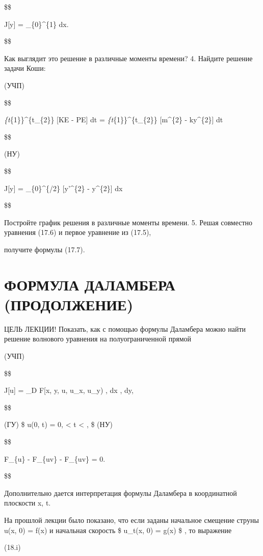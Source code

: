 \documentclass[
  ukrainian,
]{article}
\begin{document}
\$\$

J{[}y{]} = \int\_\{0\}\^{}\{1\}  dx.

\$\$

Как выглядит это решение в различные моменты времени? 4. Найдите решение
задачи Коши:

(УЧП)

\$\$

\int\emph{\{t}\{1\}\}\^{}\{t\_\{2\}\} {[}KE - PE{]} dt = 
\int\emph{\{t}\{1\}\}\^{}\{t\_\{2\}\} {[}m\^{}\{2\} -
ky\^{}\{2\}{]} dt

\$\$

(НУ)

\$\$

J{[}y{]} = \int\_\{0\}\^{}\{\pi/2\} {[}y'\^{}\{2\} - y\^{}\{2\}{]} dx

\$\$

Постройте график решения в различные моменты времени. 5. Решая совместно
уравнения (17.6) и первое уравнение из (17.5),

получите формулы (17.7).

\section{ФОРМУЛА ДАЛАМБЕРА
(ПРОДОЛЖЕНИЕ)}\label{ux444ux43eux440ux43cux443ux43bux430-ux434ux430ux43bux430ux43cux431ux435ux440ux430-ux43fux440ux43eux434ux43eux43bux436ux435ux43dux438ux435}

ЦЕЛЬ ЛЕКЦИИ! Показать, как с помощью формулы Даламбера можно найти
решение волнового уравнения на полуограниченной прямой

(УЧП)

\$\$

J{[}u{]} = \iint\_D F{[}x, y, u, u\_x, u\_y) , dx , dy,

\$\$

(ГУ) \$ u(0, t) = 0,  \textless{} t \textless{} \infty, \$ (НУ)

\$\$

F\_\{u\} -  F\_\{uv\} -
 F\_\{uv\} = 0.

\$\$

Дополнительно дается интерпретация формулы Даламбера в координатной
плоскости x, t.

На прошлой лекции было показано, что если заданы начальное смещение
струны u(x, 0) = f(x) и начальная скорость \$ u\_t(x, 0) = g(x) \$ , то
выражение

(18.i)
\end{document}
